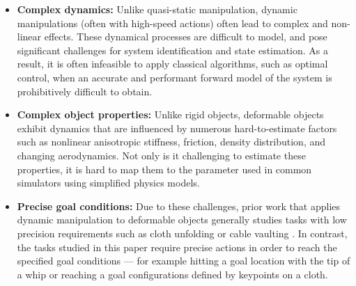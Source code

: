 \begin{itemize}[leftmargin=3mm]
\item \textbf{Complex dynamics:} Unlike quasi-static manipulation, dynamic manipulations (often with high-speed actions) often lead to complex and non-linear effects. 
These dynamical processes are difficult to model, and pose significant challenges for system identification and state estimation.
As a result, it is often infeasible to apply classical algorithms, such as optimal control, when an accurate and performant forward model of the system is prohibitively difficult to obtain.

\item \textbf{Complex object properties:} 
Unlike rigid objects, deformable objects exhibit dynamics that are influenced by numerous hard-to-estimate factors such as nonlinear anisotropic stiffness, friction, density distribution, and changing aerodynamics. Not only is it challenging to estimate these properties, it is hard to map them to the parameter used in common simulators using simplified physics models.




\item \textbf{Precise goal conditions:}  Due to these challenges, prior work that applies dynamic manipulation to deformable objects generally studies tasks with low precision requirements such as cloth unfolding \cite{ha2021flingbot} or cable vaulting \cite{zhang2021robots}. In contrast, the tasks studied in this paper require precise actions in order to reach the specified goal conditions --- for example hitting a goal location with the tip of a whip or reaching a goal configurations defined by keypoints on a cloth.

\end{itemize}


